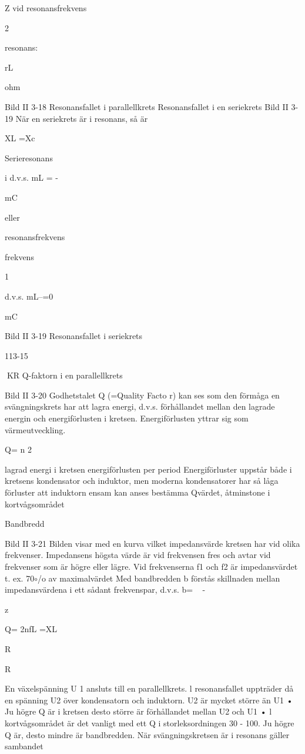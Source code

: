 \documentclass[a4paper,twoside,twocolumn,openright]{book}
\begin{document}
{{{{{{Z vid
resonansfrekvens

2

resonans:

rL

ohm

Bild II 3-18 Resonansfallet i parallellkrets
Resonansfallet i en seriekrets
Bild II 3-19
När en seriekrets är i resonans, så är

XL =Xc

Serieresonans

i
d.v.s. mL = -

mC

eller

resonansfrekvens

frekvens

1

d.v.s. mL--=0

mC

Bild II 3-19 Resonansfallet i seriekrets

113-15

KR
Q-faktorn i en parallellkrets

Bild II 3-20
Godhetstalet Q (=Quality Facto r) kan ses
som den förmåga en svängningskrets har att
lagra energi, d.v.s. förhållandet mellan den
lagrade energin och energiförlusten i kretsen. Energiförlusten yttrar sig som värmeutveckling.

Q= n
2

lagrad energi i kretsen
energiförlusten per period
Energiförluster uppstår både i kretsens
kondensator och induktor, men moderna
kondensatorer har så låga förluster att
induktorn ensam kan anses bestämma Qvärdet, åtminstone i kortvågsområdet

Bandbredd

Bild II 3-21
Bilden visar med en kurva vilket impedansvärde kretsen har vid olika frekvenser.
Impedansens högsta värde är vid frekvensen fres och avtar vid frekvenser som är högre
eller lägre. Vid frekvenserna f1 och f2 är
impedansvärdet t. ex. 70$\circ$/o av maximalvärdet
Med bandbredden b förstås skillnaden mellan impedansvärdena i ett sådant frekvenspar, d.v.s. b= ~ - ~

z

Q= 2nfL =XL

R

R

En växelspänning U 1 ansluts till en
parallellkrets. l resonansfallet uppträder då
en spänning U2 över kondensatorn och
induktorn.
U2 är mycket större än U1 • Ju högre Q är
i kretsen desto större är förhållandet mellan
U2 och U1 •
l kortvågsområdet är det vanligt med ett
Q i storleksordningen 30 - 100.
Ju högre Q är, desto mindre är bandbredden.
När svängningskretsen är i resonans gäller sambandet

}}}}}}
\end{document}
